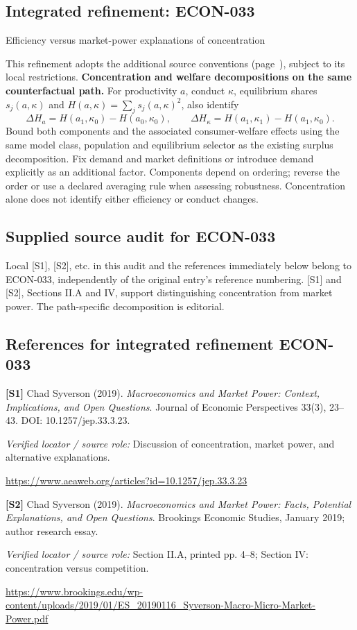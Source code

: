 \documentclass[11pt,a4paper]{article}
\begin{document}
\subsection*{Integrated refinement: ECON-033}
{\sffamily\small\color{muted}Efficiency versus market-power explanations of concentration\par}
This refinement adopts the additional source conventions
(page~\pageref{audited:conventions}), subject to its local restrictions.
\textbf{Concentration and welfare decompositions on the same counterfactual path.}
For productivity $a$, conduct $\kappa$, equilibrium shares $s_j(a,\kappa)$ and
$H(a,\kappa)=\sum_js_j(a,\kappa)^2$, also identify
\[
\Delta H_a=H(a_1,\kappa_0)-H(a_0,\kappa_0),\qquad
\Delta H_\kappa=H(a_1,\kappa_1)-H(a_1,\kappa_0).
\]
Bound both components and the associated consumer-welfare effects using the same
model class, population and equilibrium selector as the existing surplus
decomposition. Fix demand and market definitions or introduce demand explicitly
as an additional factor. Components depend on ordering; reverse the order or use
a declared averaging rule when assessing robustness. Concentration alone does
not identify either efficiency or conduct changes.
\subsection*{Supplied source audit for ECON-033}
Local [S1], [S2], etc. in this audit and the references immediately below
belong to ECON-033, independently of the original entry's reference numbering.
[S1] and [S2], Sections II.A and IV, support distinguishing concentration from market power. The path-specific decomposition is editorial.
\subsection*{References for integrated refinement ECON-033}
{\footnotesize\raggedright
\par\noindent\textbf{[S1]} Chad Syverson (2019). \emph{Macroeconomics and Market Power: Context, Implications, and Open Questions}. Journal of Economic Perspectives 33(3), 23–43. DOI: 10.1257/jep.33.3.23.\par \textit{Verified locator / source role:} Discussion of concentration, market power, and alternative explanations.\par \url{https://www.aeaweb.org/articles?id=10.1257/jep.33.3.23}\par\smallskip
\par\noindent\textbf{[S2]} Chad Syverson (2019). \emph{Macroeconomics and Market Power: Facts, Potential Explanations, and Open Questions}. Brookings Economic Studies, January 2019; author research essay.\par \textit{Verified locator / source role:} Section II.A, printed pp. 4–8; Section IV: concentration versus competition.\par \url{https://www.brookings.edu/wp-content/uploads/2019/01/ES_20190116_Syverson-Macro-Micro-Market-Power.pdf}\par\smallskip
}
\end{document}

